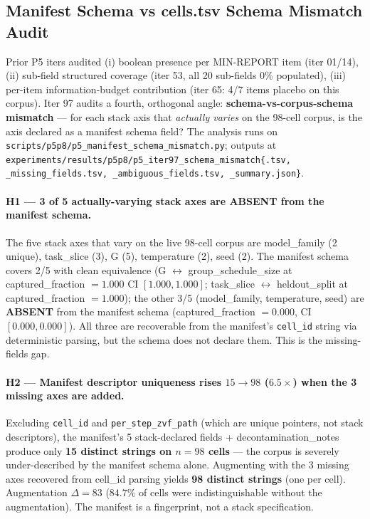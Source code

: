 \subsection{Manifest Schema vs cells.tsv Schema Mismatch Audit}
\label{sec:p5-iter97-schema-mismatch}

Prior P5 iters audited (i) boolean presence per MIN-REPORT item
(iter 01/14), (ii) sub-field structured coverage (iter 53, all 20
sub-fields 0\% populated), (iii) per-item information-budget
contribution (iter 65: 4/7 items placebo on this corpus). Iter 97
audits a fourth, orthogonal angle: \textbf{schema-vs-corpus-schema
mismatch} --- for each stack axis that \emph{actually varies} on the
98-cell corpus, is the axis declared as a manifest schema field? The
analysis runs on
\texttt{scripts/p5p8/p5\_manifest\_schema\_mismatch.py}; outputs at
\texttt{experiments/results/p5p8/p5\_iter97\_schema\_mismatch\{.tsv,
\_missing\_fields.tsv, \_ambiguous\_fields.tsv, \_summary.json\}}.

\paragraph{H1 --- 3 of 5 actually-varying stack axes are ABSENT from
the manifest schema.}
The five stack axes that vary on the live 98-cell corpus are
\textsf{model\_family} (2 unique), \textsf{task\_slice} (3),
\textsf{G} (5), \textsf{temperature} (2), \textsf{seed} (2). The
manifest schema covers 2/5 with clean equivalence (\textsf{G}
$\leftrightarrow$ \textsf{group\_schedule\_size} at captured\_fraction
$=1.000$ CI $[1.000, 1.000]$; \textsf{task\_slice} $\leftrightarrow$
\textsf{heldout\_split} at captured\_fraction $=1.000$); the other
3/5 (\textsf{model\_family}, \textsf{temperature}, \textsf{seed})
are \textbf{ABSENT} from the manifest schema
(captured\_fraction $=0.000$, CI $[0.000, 0.000]$). All three are
recoverable from the manifest's \texttt{cell\_id} string via
deterministic parsing, but the schema does not declare them. This
is the missing-fields gap.

\paragraph{H2 --- Manifest descriptor uniqueness rises $15 \to 98$
($6.5\times$) when the 3 missing axes are added.}
Excluding \texttt{cell\_id} and \texttt{per\_step\_zvf\_path} (which
are unique pointers, not stack descriptors), the manifest's 5
stack-declared fields + \textsf{decontamination\_notes} produce
only \textbf{15 distinct strings on $n{=}98$ cells} --- the corpus
is severely under-described by the manifest schema alone. Augmenting
with the 3 missing axes recovered from cell\_id parsing yields
\textbf{98 distinct strings} (one per cell). Augmentation
$\Delta = 83$ ($84.7\%$ of cells were indistinguishable without
the augmentation). The manifest is a fingerprint, not a stack
specification.

